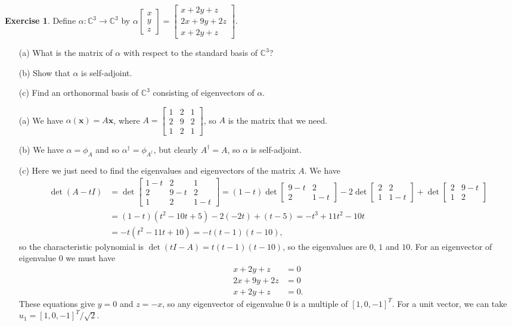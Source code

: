 \documentclass{amsart}
\newcommand{\C}         {{\mathbb{C}}}
\newcommand{\bsm}       {\left[\begin{smallmatrix}}
\newcommand{\esm}       {\end{smallmatrix}\right]}
\newcommand{\al}        {\alpha}
\newcommand{\vx}        {\mathbf{x}}
\renewcommand{\:}       {\colon}
\theoremstyle{definition}
\newtheorem{exercise}{Exercise}[section]
\renewenvironment{solution}{\SolutionAtEnd}{\endSolutionAtEnd}
\begin{document}
\begin{exercise}\label{ex-self-adjoint}
 Define $\al\:\C^3\to\C^3$ by 
 $\displaystyle\al\bsm x\\ y\\ z\esm =
  \bsm x+2y+z\\ 2x+9y+2z\\ x+2y+z\esm$.
 \begin{itemize}
  \item[(a)] What is the matrix of $\al$ with respect to the standard
   basis of $\C^3$?
  \item[(b)] Show that $\al$ is self-adjoint.
  \item[(c)] Find an orthonormal basis of $\C^3$ consisting of
   eigenvectors of $\al$.
 \end{itemize}
\end{exercise}
\begin{solution}
 \begin{itemize}
  \item[(a)] We have $\al(\vx)=A\vx$, where 
   $\displaystyle A=\bsm 1&2&1\\ 2&9&2\\ 1&2&1\esm$, so $A$ is the
   matrix that we need.
  \item[(b)] We have $\al=\phi_A$ and so $\al^\dag=\phi_{A^\dag}$, but
   clearly $A^\dag=A$, so $\al$ is self-adjoint.
  \item[(c)] Here we just need to find the eigenvalues and
   eigenvectors of the matrix $A$.  We have
   \begin{align*}
    \det(A-tI) &=
       \det\bsm 1-t & 2 & 1 \\ 2 & 9-t & 2 \\ 1 & 2 & 1-t \esm 
     = (1-t)\det\bsm 9-t & 2 \\ 2 & 1-t \esm 
         -2 \det\bsm 2 & 2 \\ 1 & 1-t \esm 
          + \det\bsm 2 & 9-t \\ 1 & 2 \esm \\
    &= (1-t)(t^2-10t+5)  - 2(-2t) + (t-5) 
     = -t^3 + 11t^2 - 10t  \\
    &= -t(t^2-11t+10) = -t(t-1)(t-10),
   \end{align*}
   so the characteristic polynomial is $\det(tI-A)=t(t-1)(t-10)$, so
   the eigenvalues are $0$, $1$ and $10$.  For an eigenvector of
   eigenvalue $0$ we must have 
   \begin{align*}
    x+2y+z &= 0 \\
    2x+9y+2z &= 0 \\
    x+2y+z &= 0.
   \end{align*}
   These equations give $y=0$ and $z=-x$, so any eigenvector of
   eigenvalue $0$ is a multiple of $[1,0,-1]^T$.  For a unit vector,
   we can take $u_1=[1,0,-1]^T/\sqrt{2}$.


\end{itemize}
\end{solution}
\end{document}
